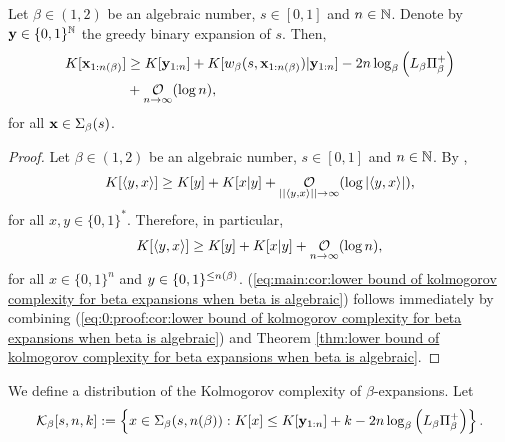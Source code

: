 \begin{corollary}\label{cor:lower bound of kolmogorov complexity for beta expansions when beta is algebraic}
    Let $\beta \in (1,2)$ be an algebraic number, $s \in [0,1]$ and $n \in \mathbb{N}$. Denote by ${\bf y} \in \{0,1\}^{\mathbb{N}}$ the greedy binary expansion of $s$. Then,
    \begin{align}
        K[\xf_{1:\nlogbeta}] &\geq K[\yf_{1:n}] + K[w_\beta(s,\xf_{1:\nlogbeta})|\yf_{1:n}] - 2n \log_\beta\left(L_\beta \Pi_\beta^+\right) \nonumber\\ 
        &+ \bigOx[\log n]{n},\label{eq:main:cor:lower bound of kolmogorov complexity for beta expansions when beta is algebraic}
    \end{align}
    for all ${\bf x} \in \Sigma_\beta(s)$.
\end{corollary}
\begin{proof}
    Let $\beta \in (1,2)$ be an algebraic number, $s \in [0,1]$ and $n \in \mathbb{N}$.
    By \cite[Theorem 2.8.2]{li2008introduction}, 
    \begin{equation}
        K[\langle y,x\rangle] \geq K[y] + K[x|y] + \bigOw[\log |\langle y,x\rangle|]{|\langle y,x \rangle|},
    \end{equation}
    for all $x,y \in \{0,1\}^\ast$. Therefore, in particular,
    \begin{equation}\label{eq:0:proof:cor:lower bound of kolmogorov complexity for beta expansions when beta is algebraic}
        K[\langle y,x\rangle] \geq K[y] + K[x|y] + \bigOx[\log n]{n},
    \end{equation}
    for all $x \in \{0,1\}^n$ and $y \in \{0,1\}^{\leq n(\beta)}$. (\ref{eq:main:cor:lower bound of kolmogorov complexity for beta expansions when beta is algebraic}) follows immediately by combining (\ref{eq:0:proof:cor:lower bound of kolmogorov complexity for beta expansions when beta is algebraic}) and Theorem \ref{thm:lower bound of kolmogorov complexity for beta expansions when beta is algebraic}.
\end{proof}
\noindent We define a distribution of the Kolmogorov complexity of $\beta$-expansions. Let 
\begin{equation}
    \mathcal{K}_\beta[s,n,k] := \left\{ x \in \Sigma_\beta(s,n(\beta)) : K[x] \leq K[{\bf y}_{1:n}] + k - 2n \log_\beta\left(L_\beta \Pi_\beta^+\right)\right\}.
\end{equation}

